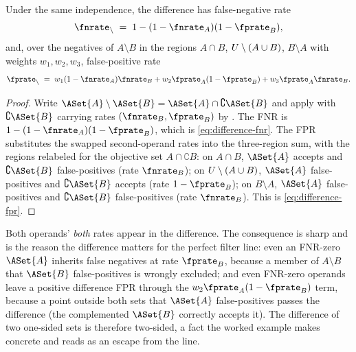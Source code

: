 \begin{proposition}
\label{prop:difference-fpr-fnr}
Under the same independence, the difference has false-negative rate
\begin{equation}
\label{eq:difference-fnr}
  \fnrate_\setminus \;=\; 1 - (1 - \fnrate_A)(1 - \fprate_B),
\end{equation}
and, over the negatives of $A \setminus B$ in the regions $A \cap B$,
$U \setminus (A \cup B)$, $B \setminus A$ with weights
$w_1, w_2, w_3$, false-positive rate
\begin{equation}
\label{eq:difference-fpr}
  \fprate_\setminus
  \;=\; w_1 (1 - \fnrate_A)\fnrate_B
        + w_2 \fprate_A (1 - \fprate_B)
        + w_3 \fprate_A \fnrate_B.
\end{equation}
\end{proposition}

\begin{proof}
Write $\ASet{A} \setminus \ASet{B} = \ASet{A} \cap \complement \ASet{B}$ and
apply  with $\complement \ASet{B}$ carrying
rates $(\fnrate_B, \fprate_B)$ by . The FNR is
$1 - (1 - \fnrate_A)(1 - \fprate_B)$, which is \eqref{eq:difference-fnr}. The
FPR substitutes the swapped second-operand rates into the three-region sum,
with the regions relabeled for the objective set $A \cap \complement B$: on
$A \cap B$, $\ASet{A}$ accepts and $\complement \ASet{B}$ false-positives
(rate $\fnrate_B$); on $U \setminus (A \cup B)$, $\ASet{A}$
false-positives and $\complement \ASet{B}$ accepts (rate $1 - \fprate_B$); on
$B \setminus A$, $\ASet{A}$ false-positives and $\complement \ASet{B}$
false-positives (rate $\fnrate_B$). This is \eqref{eq:difference-fpr}.
\end{proof}

Both operands' \emph{both} rates appear in the difference. The consequence is
sharp and is the reason the difference matters for the perfect filter line:
even an FNR-zero $\ASet{A}$ inherits false negatives at rate $\fprate_B$,
because a member of $A \setminus B$ that $\ASet{B}$ false-positives is wrongly
excluded; and even FNR-zero operands leave a positive difference FPR through
the $w_2 \fprate_A(1 - \fprate_B)$ term, because a point outside both sets
that $\ASet{A}$ false-positives passes the difference (the complemented
$\ASet{B}$ correctly accepts it). The difference of two one-sided sets is
therefore two-sided, a fact the worked example makes concrete and
 reads as an escape from the line.

